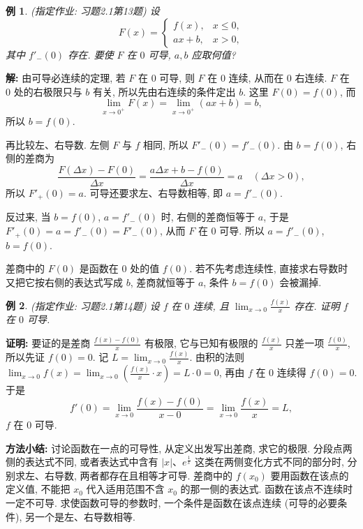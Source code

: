 \documentclass[UTF8,openany]{ctexbook}
\theoremstyle{chinesetextbook}
\newtheorem{example}{例}[section]
\newenvironment{cnproof}{\par\indent\textbf{证明:} \ignorespaces}{\par}
\newenvironment{cnsolution}{\par\indent\textbf{解:} \ignorespaces}{\par}
\begin{document}
\begin{example}\label{ex:c2-h1-13}
\textnormal{(指定作业: 习题2.1第13题)} 设
\[
F(x)=\begin{cases}f(x),&x\le0,\\ax+b,&x>0,\end{cases}
\]
其中 $f'_-(0)$ 存在. 要使 $F$ 在 $0$ 可导, $a,b$ 应取何值?
\end{example}
\begin{cnsolution}
由可导必连续的定理, 若 $F$ 在 $0$ 可导, 则 $F$ 在 $0$ 连续, 从而在 $0$ 右连续. $F$ 在 $0$ 处的右极限只与 $b$ 有关, 所以先由右连续的条件定出 $b$. 这里 $F(0)=f(0)$, 而
\[
\lim_{x\to0^+}F(x)=\lim_{x\to0^+}(ax+b)=b,
\]
所以 $b=f(0)$.

再比较左、右导数. 左侧 $F$ 与 $f$ 相同, 所以 $F'_-(0)=f'_-(0)$. 由 $b=f(0)$, 右侧的差商为
\[
\frac{F(\Delta x)-F(0)}{\Delta x}=\frac{a\Delta x+b-f(0)}{\Delta x}=a\quad(\Delta x>0),
\]
所以 $F'_+(0)=a$. 可导还要求左、右导数相等, 即 $a=f'_-(0)$.

反过来, 当 $b=f(0)$, $a=f'_-(0)$ 时, 右侧的差商恒等于 $a$, 于是 $F'_+(0)=a=f'_-(0)=F'_-(0)$, 从而 $F$ 在 $0$ 可导. 所以 $a=f'_-(0)$, $b=f(0)$.
\end{cnsolution}
差商中的 $F(0)$ 是函数在 $0$ 处的值 $f(0)$. 若不先考虑连续性, 直接求右导数时又把它按右侧的表达式写成 $b$, 差商就恒等于 $a$, 条件 $b=f(0)$ 会被漏掉.
\begin{example}\label{ex:c2-h1-14}
\textnormal{(指定作业: 习题2.1第14题)} 设 $f$ 在 $0$ 连续, 且 $\displaystyle\lim_{x\to0}\frac{f(x)}x$ 存在. 证明 $f$ 在 $0$ 可导.
\end{example}
\begin{cnproof}
要证的是差商 $\displaystyle\frac{f(x)-f(0)}x$ 有极限, 它与已知有极限的 $\displaystyle\frac{f(x)}x$ 只差一项 $\displaystyle\frac{f(0)}x$, 所以先证 $f(0)=0$. 记 $\displaystyle L=\lim_{x\to0}\frac{f(x)}x$. 由积的法则 $\displaystyle\lim_{x\to0}f(x)=\lim_{x\to0}\left(\frac{f(x)}x\cdot x\right)=L\cdot0=0$, 再由 $f$ 在 $0$ 连续得 $f(0)=0$. 于是
\[
f'(0)=\lim_{x\to0}\frac{f(x)-f(0)}{x-0}=\lim_{x\to0}\frac{f(x)}x=L,
\]
$f$ 在 $0$ 可导.
\end{cnproof}
\par\indent\textbf{方法小结:} 讨论函数在一点的可导性, 从定义出发写出差商, 求它的极限. 分段点两侧的表达式不同, 或者表达式中含有 $|x|$、$e^{\frac1x}$ 这类在两侧变化方式不同的部分时, 分别求左、右导数, 两者都存在且相等才可导. 差商中的 $f(x_0)$ 要用函数在该点的定义值, 不能把 $x_0$ 代入适用范围不含 $x_0$ 的那一侧的表达式. 函数在该点不连续时一定不可导. 求使函数可导的参数时, 一个条件是函数在该点连续 (可导的必要条件), 另一个是左、右导数相等.
\end{document}
